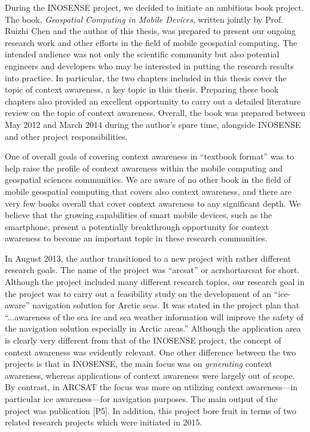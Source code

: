 During the INOSENSE project, we decided to initiate an ambitious book project. The book, \emph{Geospatial Computing in Mobile Devices}, written jointly by Prof. Ruizhi Chen and the author of this thesis, was prepared to present our ongoing research work and other efforts in the field of mobile geospatial computing. The intended audience was not only the scientific community but also potential engineers and developers who may be interested in putting the research results into practice. In particular, the two chapters included in this thesis cover the topic of context awareness, a key topic in this thesis. Preparing these book chapters also provided an excellent opportunity to carry out a detailed literature review on the topic of context awareness. Overall, the book was prepared between May 2012 and March 2014 during the author's spare time, alongside INOSENSE and other project responsibilities. 

One of overall goals of covering context awareness in ``textbook format'' was to help raise the profile of context awareness within the mobile computing and geospatial sciences communities. We are aware of no other book in the field of mobile geospatial computing that covers also context awareness, and there are very few books overall that cover context awareness to any significant depth.  We believe that the growing capabilities of smart mobile devices, such as the smartphone, present a potentially breakthrough opportunity for context awareness to become an important topic in these research communities.

In August 2013, the author transitioned to a new project with rather different research goals. The name of the project was ``\acrlong{arcsat}'' or acrshort{arcsat} for short. Although the project included many different research topics, our research goal in the project was to carry out a feasibility study on the development of an ``ice-aware'' navigation solution for Arctic seas. It was stated in the project plan that ``...awareness of the sea ice and sea weather information will improve the safety of the navigation solution especially in Arctic areas.'' Although the application area is clearly very different from that of the INOSENSE project, the concept of context awareness was evidently relevant. One other difference between the two projects is that in INOSENSE, the main focus was on \emph{generating} context awareness, whereas applications of context awareness were largely out of scope. By contrast, in ARCSAT the focus was more on utilizing context awareness---in particular ice awareness---for navigation purposes. The main output of the project was publication [P5]. In addition, this project bore fruit in terms of two related research projects which were initiated in 2015.

